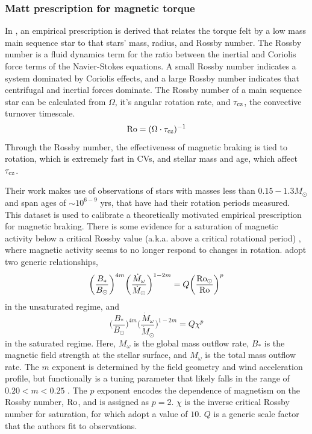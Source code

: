 \subsubsection{Matt prescription for magnetic torque}
\label{sect:introduction:matt braking}

In \citet{matt2015}, an empirical prescription is derived that relates the torque felt by a low mass main sequence star to that stars' mass, radius, and Rossby number. The Rossby number is a fluid dynamics term for the ratio between the inertial and Coriolis force terms of the Navier-Stokes equations. A small Rossby number indicates a system dominated by Coriolis effects, and a large Rossby number indicates that centrifugal and inertial forces dominate. The Rossby number of a main sequence star can be calculated from $\Omega$, it's angular rotation rate, and $\tau_{\rm cz}$, the convective turnover timescale.
\begin{equation}
    \label{eqn:introduction:rossby number}
    {\rm Ro} = (\Omega \cdot \tau_{\rm cz})^{-1}
\end{equation}
Through the Rossby number, the effectiveness of magnetic braking is tied to rotation, which is extremely fast in CVs, and stellar mass and age, which affect $\tau_{\rm cz}$.

Their work makes use of observations of stars with masses less than $0.15 - 1.3 M_\odot$ and span ages of $\sim 10^{6-9}$ yrs, that have had their rotation periods measured. This dataset is used to calibrate a theoretically motivated empirical prescription for magnetic braking. There is some evidence for a saturation of magnetic activity below a critical Rossby value (a.k.a. above a critical rotational period) \citep{reiners2009}, where magnetic activity seems to no longer respond to changes in rotation. \citet{matt2015} adopt two generic relationships, 
\begin{equation}
    \bigg(\frac{B_*}{B_\odot}\bigg)^{4m} \bigg(\frac{\dot M_\omega}{\dot M_\odot}\bigg)^{1-2m} = Q \bigg(\frac{\rm Ro_\odot}{\rm Ro} \bigg)^{p}
\end{equation}
in the unsaturated regime, and 
\begin{equation}
    \bigg(\frac{B_*}{B_\odot}\bigg)^{4m} \bigg(\frac{\dot M_\omega}{\dot M_\odot}\bigg)^{1-2m} = Q \chi^{p}
\end{equation}
in the saturated regime. Here, $M_\omega$ is the global mass outflow rate, $B_*$ is the magnetic field strength at the stellar surface, and $M_\omega$ is the total mass outflow rate. The $m$ exponent is determined by the field geometry and wind acceleration profile, but functionally is a tuning parameter that likely falls in the range of $0.20 < m < 0.25$ \citep{matt2015}. The $p$ exponent encodes the dependence of magnetism on the Rossby number, $\rm Ro$, and is assigned as $p = 2$. $\chi$ is the inverse critical Rossby number for saturation, for which \citet{matt2015} adopt a value of $10$. $Q$ is a generic scale factor that the authors fit to observations.

